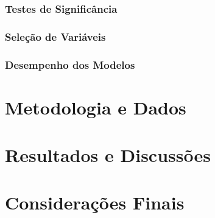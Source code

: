 \documentclass[
	12pt,				%
	openright,			%
	oneside,      %
	a4paper,			%
	english,			%
	french,				%
	spanish,			%
	brazil,				%
	]{abntex2}\usepackage[]{graphicx}\usepackage[]{xcolor}
\begin{document}
      \subsection{Testes de Significância}





      \subsection{Seleção de Variáveis}




      \subsection{Desempenho dos Modelos}


\chapter{Metodologia e Dados}


\chapter{Resultados e Discussões}





\chapter{Considerações Finais}






%
%


\end{document}
